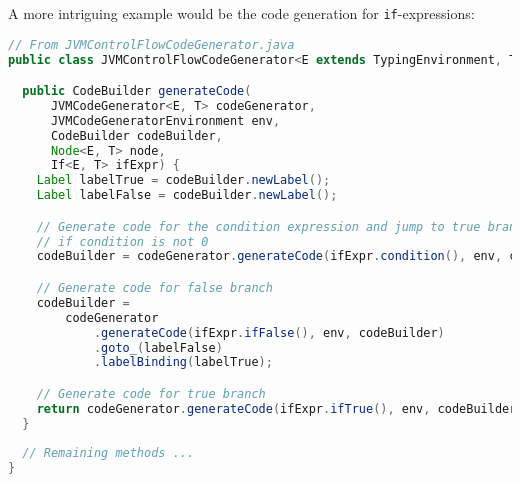 A more intriguing example would be the code generation for \texttt{if}-expressions:

\begin{lstlisting}[language=Java]
// From JVMControlFlowCodeGenerator.java
public class JVMControlFlowCodeGenerator<E extends TypingEnvironment, T extends Type> {

  public CodeBuilder generateCode(
      JVMCodeGenerator<E, T> codeGenerator,
      JVMCodeGeneratorEnvironment env,
      CodeBuilder codeBuilder,
      Node<E, T> node,
      If<E, T> ifExpr) {
    Label labelTrue = codeBuilder.newLabel();
    Label labelFalse = codeBuilder.newLabel();

    // Generate code for the condition expression and jump to true branch
    // if condition is not 0
    codeBuilder = codeGenerator.generateCode(ifExpr.condition(), env, codeBuilder).ifne(labelTrue);

    // Generate code for false branch
    codeBuilder =
        codeGenerator
            .generateCode(ifExpr.ifFalse(), env, codeBuilder)
            .goto_(labelFalse)
            .labelBinding(labelTrue);

    // Generate code for true branch
    return codeGenerator.generateCode(ifExpr.ifTrue(), env, codeBuilder).labelBinding(labelFalse);
  }
 
  // Remaining methods ...
}
\end{lstlisting}
